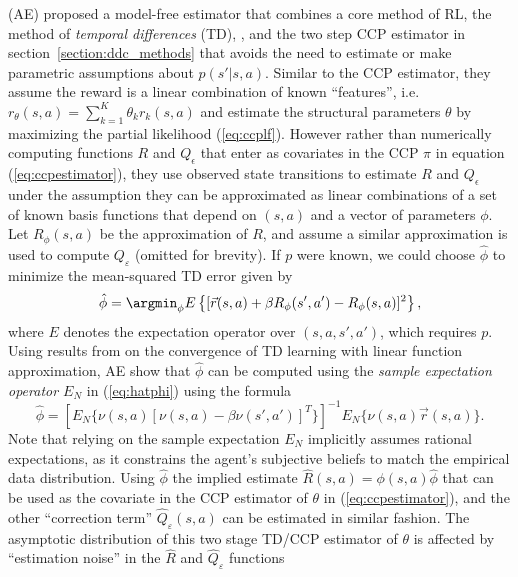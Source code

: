 \citet{AE:2022} (AE) proposed a model-free estimator that combines a core method of RL, the method of {\it temporal differences\/} (TD),
\citet{BartoSutton:2020}, and the two step \citet{hotzmiller:1993} CCP estimator in
section~\ref{section:ddc_methods} that avoids the need to estimate or make parametric assumptions about $p(s'|s,a)$. Similar to the CCP estimator, they
assume the reward is a linear combination of known ``features'', i.e. $r_\theta(s,a)=\sum_{k=1}^K \theta_k r_k(s,a)$
and  estimate the structural parameters $\theta$ by maximizing the partial likelihood (\ref{eq:ccplf}). 
However rather than numerically computing functions $R$ and $Q_\epsilon$ that
enter as covariates in the CCP $\pi$ in equation (\ref{eq:ccpestimator}), they use observed state transitions
to estimate  $R$ and $Q_\epsilon$ under the assumption they can be approximated as linear
combinations of a set of known basis functions that depend on $(s,a)$ and a vector of parameters $\phi$. Let $R_\phi(s,a)$
be the approximation of $R$, and assume a similar approximation is used to compute $Q_\varepsilon$ (omitted for brevity).
If $p$ were known, we could choose $\hat\phi$ to minimize the mean-squared TD error given by
\begin{equation}
     \hat\phi =\argmin_\phi E\left\{ [\vec{r}(s,a)+\beta R_\phi(s',a')-R_\phi(s,a)]^2\right\},
\label{eq:hatphi}
\end{equation}
where $E$ denotes the expectation operator over $(s,a,s',a')$, which requires $p$.
Using results from \citet{TsitsiklisVanRoy:1997} on the convergence of TD learning with linear function approximation, 
AE show that $\hat\phi$ can be computed using the {\it sample expectation operator $E_N$\/} in (\ref{eq:hatphi})
using the formula
\begin{equation}
     \hat\phi = \left[E_N\{\nu(s,a)[\nu(s,a)-\beta\nu(s',a')]^{{\scriptscriptstyle T}}\}\right]^{-1} E_N\{\nu(s,a)\vec{r}(s,a)\}.
\label{eq:QR_regression}
\end{equation}
Note that relying on the sample expectation $E_N$ implicitly assumes rational expectations, as it constrains the agent's subjective beliefs to match the empirical data distribution.
Using $\hat\phi$ the implied estimate $\hat R(s,a)=\phi(s,a)\hat\phi$ that can be used as the covariate 
in the CCP estimator of  $\theta$ in (\ref{eq:ccpestimator}), and the other ``correction term''  $\hat Q_\varepsilon(s,a)$
can be estimated in similar fashion. The asymptotic distribution of this two stage TD/CCP estimator of $\theta$  is 
 affected by ``estimation noise'' in the $\hat R$ and $\hat Q_{\varepsilon}$ functions
